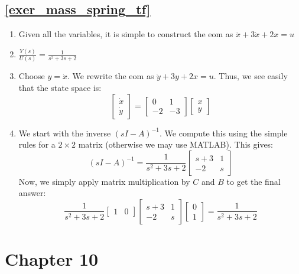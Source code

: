 \subsection*{\texorpdfstring{\autoref{exer_mass_spring_tf}}{Mass Spring Damper Transfer Function}}
\begin{enumerate}
    \item Given all the variables, it is simple to construct the \gls{eom} as $\ddot{x}+3\dot{x}+2x=u$
    \item $\frac{Y(s)}{U(s)}=\frac{1}{s^2+3s+2}$
    \item Choose $y=\dot{x}$. We rewrite the \gls{eom} as $\dot{y}+3y+2x=u$. Thus, we see easily that the state space is:$$\begin{bmatrix}
        \dot{x}\\\dot{y}
    \end{bmatrix}=\begin{bmatrix}
        0&1\\-2&-3
    \end{bmatrix}\begin{bmatrix}
        x\\y
    \end{bmatrix}$$
    \item We start with the inverse $(sI-A)^{-1}$. We compute this using the simple rules for a $2\times 2$ matrix (otherwise we may use MATLAB). This gives:$$(sI-A)^{-1}=\frac{1}{s^2+3s+2}\begin{bmatrix}
        s+3&1\\-2&s
    \end{bmatrix}$$Now, we simply apply matrix multiplication by $C$ and $B$ to get the final answer:$$\frac{1}{s^2+3s+2}\begin{bmatrix}
        1&0
    \end{bmatrix}\begin{bmatrix}
        s+3&1\\-2&s
    \end{bmatrix}\begin{bmatrix}
        0\\1
    \end{bmatrix}=\frac{1}{s^2+3s+2}$$
\end{enumerate}


\section{Chapter 10}


